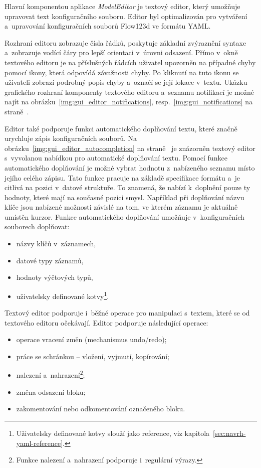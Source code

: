 \documentclass[FM,bw,DP]{tulthesis}
\begin{document}
Hlavní komponentou aplikace \textit{ModelEditor} je textový editor, který umožňuje upravovat text konfiguračního souboru. Editor byl optimalizován pro vytváření a~upravování konfiguračních souborů Flow123d ve formátu \gls{YAML}.

Rozhraní editoru zobrazuje čísla řádků, poskytuje základní zvýraznění syntaxe a~zobrazuje vodící čáry pro lepší orientaci v~úrovni odsazení. Přímo v~okně textového editoru je na příslušných řádcích uživatel upozorněn na případné chyby pomocí ikony, která odpovídá závažnosti chyby. Po kliknutí na tuto ikonu se uživateli zobrazí podrobný popis chyby a~označí se její lokace v~textu. Ukázku grafického rozhraní komponenty textového editoru a~seznamu notifikací je možné najít na obrázku~\ref{img:gui_editor_notifications}, resp.~\ref{img:gui_notifications} na straně~\pageref{img:gui_editor_notifications}. 

Editor také podporuje funkci automatického doplňování textu, které značně urychluje zápis konfiguračních souborů. Na obrázku~\ref{img:gui_editor_autocompletion} na straně~\pageref{img:gui_editor_autocompletion} je znázorněn textový editor s~vyvolanou nabídkou pro automatické doplňování textu. Pomocí funkce automatického doplňování je možné vybrat hodnotu z~nabízeného seznamu místo jejího celého zápisu. Tato funkce pracuje na základě specifikace formátu a~je citlivá na pozici v~datové struktuře. To znamená, že nabízí k~doplnění pouze ty hodnoty, které mají na současné pozici smysl. Například při doplňování názvu klíče jsou nabízené možnosti závislé na tom, ve kterém záznamu je aktuálně umístěn kurzor. Funkce automatického doplňování umožňuje v~konfiguračních souborech doplňovat:

\begin{itemize}
\item názvy klíčů v~záznamech,
\item datové typy záznamů,
\item hodnoty výčtových typů,
\item uživatelsky definované kotvy\footnote{Uživatelsky definované kotvy slouží jako reference, viz kapitola~\ref{sec:navrh-yaml-reference}.}.
\end{itemize}

Textový editor podporuje i~běžné operace pro manipulaci s~textem, které se od textového editoru očekávají. Editor podporuje následující operace:

\begin{itemize}
\item operace vracení změn (mechanismus undo/redo);
\item práce se schránkou -- vložení, vyjmutí, kopírování;
\item nalezení a~nahrazení\footnote{Funkce nalezení a~nahrazení podporuje i~regulární výrazy.};
\item změna odsazení bloku;
\item zakomentování nebo odkomentování označeného bloku.
\end{itemize}
\end{document}
